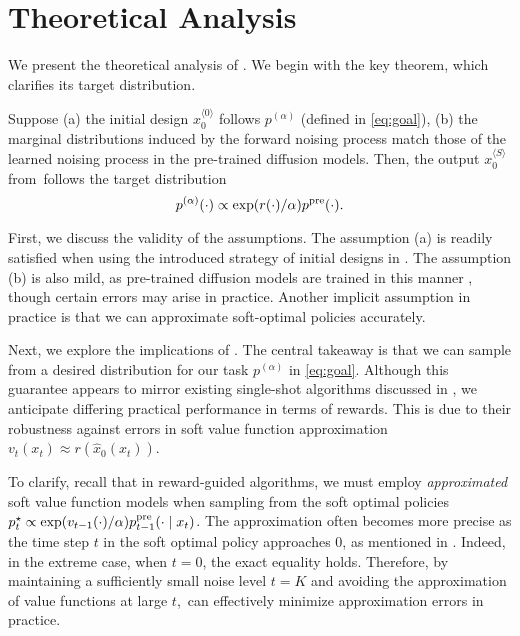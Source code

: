 \section{Theoretical Analysis} \label{sec:analysis}

We present the theoretical analysis of \alg. We begin with the key theorem, which clarifies its target distribution.

\begin{theorem}\label{thm:key}
Suppose (a) the initial design $x^{\langle 0 \rangle}_0$ follows $p^{(\alpha)}$ (defined in \eqref{eq:goal}), (b) the marginal distributions induced by the forward noising process match those of the learned noising process in the pre-trained diffusion models. Then, the output $x^{\langle S \rangle}_0$ from \alg\,follows the target distribution $$p^{(\alpha)}(\cdot) \propto \exp(r(\cdot)/\alpha)p^{\mathrm{pre}}(\cdot).$$ 
\end{theorem}

First, we discuss the validity of the assumptions. The assumption (a) is readily satisfied when using the introduced strategy of initial designs in . The assumption (b) is also mild, as pre-trained diffusion models are trained in this manner \citep{song2021maximum}, though certain errors may arise in practice. Another implicit assumption in practice is that we can approximate soft-optimal policies accurately.  

Next, we explore the implications of . The central takeaway is that we can sample from a desired distribution for our task $p^{(\alpha)}$ in \eqref{eq:goal}. Although this guarantee appears to mirror existing single-shot algorithms discussed in , we anticipate differing practical performance in terms of rewards. This is due to their robustness against errors in soft value function approximation $v_t(x_t)\approx r(\hat x_0(x_t))$.

To clarify, recall that in reward-guided algorithms, we must employ \emph{approximated} soft value function models when sampling from the soft optimal policies $p^{\star}_t\propto \exp(v_{t-1}(\cdot)/\alpha)p^{\mathrm{pre}}_{t-1}(\cdot \mid x_t)$. The approximation often becomes more precise as the time step $t$ in the soft optimal policy approaches $0$, as mentioned in . Indeed, in the extreme case, when $t=0$, the exact equality holds. Therefore, by maintaining a sufficiently small noise level $t=K$ and avoiding the approximation of value functions at large $t$, \alg\,can effectively minimize approximation errors in practice.

